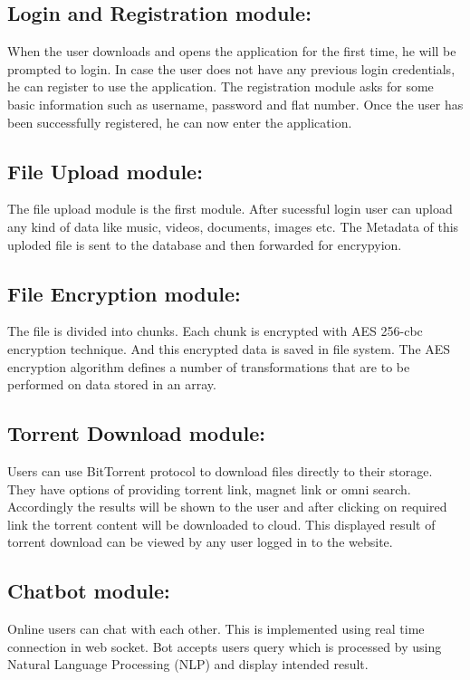 \subsection{Login and Registration module:}

When the user downloads and opens the application for the first time, he will be prompted to login. In case the user does not have any previous login credentials, he can register to use the application. The registration module asks for some basic information such as username, password and flat number. Once the user has been successfully registered, he can now enter the application.

\subsection{File Upload module:}

The file upload module is the first module. After sucessful login user can upload any kind of data like music, videos, documents, images etc. The Metadata of this uploded file is sent to the database and then  forwarded for encrypyion. 

\subsection{File Encryption module:}

The file is divided into chunks. Each chunk is encrypted with AES 256-cbc encryption technique. And this encrypted data is saved in file system. The AES encryption algorithm defines a number of transformations that are to be performed on data stored in an array.

\subsection{Torrent Download module:}
Users can use BitTorrent protocol to download files directly to their storage. They have options of providing torrent link, magnet link or omni search. Accordingly the results will be shown to the user and after clicking on required link the torrent content will be downloaded to cloud. This displayed result of torrent download can be viewed by any user logged in to the website. 


\subsection{Chatbot module:}

Online users can chat with each other. This is implemented using real time connection in web socket.  Bot accepts users query which is processed by using Natural Language Processing (NLP) and display intended result.  


